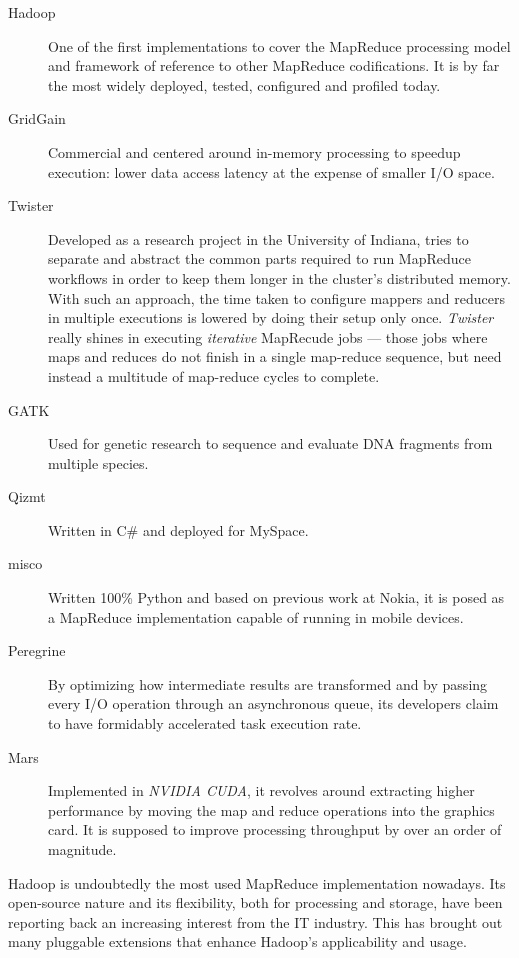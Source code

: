 \begin{description}
 \item[Hadoop] \cite{hadoopdefguide} One of the first implementations to cover the MapReduce processing model and framework of reference to other MapReduce codifications. It is by far the most widely deployed, tested, configured and profiled today.
 \item[GridGain] \cite{gridgainvshadoop} Commercial and centered around in-memory processing to speedup execution: lower data access latency at the expense of smaller I/O space.
 \item[Twister] \cite{twister} Developed as a research project in the University of Indiana, tries to separate and abstract the common parts required to run MapReduce workflows in order to keep them longer in the cluster's distributed memory. With such an approach, the time taken to configure mappers and reducers in multiple executions is lowered by doing their setup only once. \emph{Twister} really shines in executing \emph{iterative} MapRecude jobs --- those jobs where maps and reduces do not finish in  a single map-reduce sequence, but need instead a multitude of map-reduce cycles to complete.
 \item[GATK] \cite{gatk} Used for genetic research to sequence and evaluate DNA fragments from multiple species.
 \item[Qizmt] \cite{qizmt} Written in C\# and deployed for MySpace.
 \item[misco] \cite{misco} Written 100\% Python and based on previous work at Nokia, it is posed as a MapReduce implementation capable of running in mobile devices.
 \item[Peregrine] \cite{peregrine} By optimizing how intermediate results are transformed and by passing every I/O operation through an asynchronous queue, its developers claim to have formidably accelerated task execution rate.
 \item[Mars] \cite{mars} Implemented in \emph{NVIDIA CUDA}, it revolves around extracting higher performance by moving the map and reduce operations into the graphics card. It is supposed to improve processing throughput by over an order of magnitude.
\end{description}

Hadoop is undoubtedly the most used MapReduce implementation nowadays. Its open-source nature and its flexibility, both for processing and storage, have been reporting back an increasing interest from the IT industry. This has brought out many pluggable extensions that enhance Hadoop's applicability and usage.
